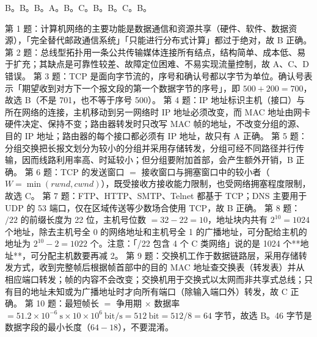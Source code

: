 \documentclass[a4paper,11pt]{article}
\begin{document}

\setcounter{question}{0}
\q B。\quad \q B。\quad \q B。\quad \q A。\quad \q B。\quad \q C。\quad \q B。\quad \q B。\quad \q C。\quad \q B。
\begin{analysis}
第 1 题：计算机网络的主要功能是数据通信和资源共享（硬件、软件、数据资源），「完全替代邮政通信系统」「只能进行分布式计算」都过于绝对，故 B 正确。
第 2 题：总线型拓扑用一条公共传输媒体连接所有结点，结构简单、成本低、易于扩充；其缺点是可靠性较差、故障定位困难、不易实现流量控制，故 A、C、D 错误。
第 3 题：TCP 是面向字节流的，序号和确认号都以字节为单位。确认号表示「期望收到对方下一个报文段的第一个数据字节的序号」，即 \(500+200=700\)，故选 B（不是 701，也不等于序号 500）。
第 4 题：IP 地址标识主机（接口）与所在网络的连接，主机移动到另一网络时 IP 地址必须改变，而 MAC 地址由网卡硬件决定、保持不变；路由器转发时只改写 MAC 帧的地址，不改变分组的源、目的 IP 地址；路由器的每个接口都必须有 IP 地址，故只有 A 正确。
第 5 题：分组交换把长报文划分为较小的分组并采用存储转发，分组可经不同路径并行传输，因而线路利用率高、时延较小；但分组要附加首部，会产生额外开销，B 正确。
第 6 题：TCP 的发送窗口 \(=\) 接收窗口与拥塞窗口中的较小者（\(W=\min(rwnd,cwnd)\)），既受接收方接收能力限制，也受网络拥塞程度限制，故选 C。
第 7 题：FTP、HTTP、SMTP、Telnet 都基于 TCP；DNS 主要用于 UDP 的 53 端口，仅在区域传送等少数场合使用 TCP，故 B 正确。
第 8 题：\(/22\) 的前缀长度为 22 位，主机号位数 \(=32-22=10\)，地址块内共有 \(2^{10}=1024\) 个地址，除去主机号全 0 的网络地址和主机号全 1 的广播地址，可分配给主机的地址为 \(2^{10}-2=1022\) 个。注意：「/22 包含 4 个 C 类网络」说的是 1024 个**地址**，可分配主机数要再减 2。
第 9 题：交换机工作于数据链路层，采用存储转发方式，收到完整帧后根据帧首部中的目的 MAC 地址查交换表（转发表）并从相应端口转发；帧的内容不会改变；交换机用于交换式以太网而非共享式总线；只有目的地址未知或为广播地址时才向所有端口（除输入端口外）转发，故 C 正确。
第 10 题：最短帧长 \(=\) 争用期 \(\times\) 数据率 \(=51.2\times 10^{-6}\ \mathrm{s}\times 10\times 10^{6}\ \mathrm{bit/s}=512\ \mathrm{bit}=512/8=64\) 字节，故选 B。46 字节是数据字段的最小长度（\(64-18\)），不要混淆。
\end{analysis}
\end{document}
